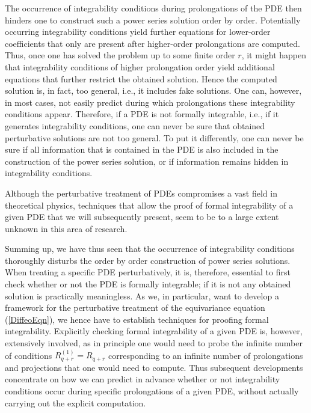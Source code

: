 The occurrence of integrability conditions during prolongations of the PDE then hinders one to construct such a power series solution order by order. Potentially occurring integrability conditions yield further equations for lower-order coefficients that only are present after higher-order prolongations are computed. Thus, once one has solved the problem up to some finite order $r$, it might happen that integrability conditions of higher prolongation order yield additional equations that further restrict the obtained solution. 
Hence the computed solution is, in fact, too general, i.e., it includes fake solutions.
One can, however, in most cases, not easily predict during which prolongations these integrability conditions appear. Therefore, if a PDE is not formally integrable, i.e., if it generates integrability conditions, one can never be sure that obtained perturbative solutions are not too general. To put it differently, one can never be sure if all information that is contained in the PDE is also included in the construction of the power series solution, or if information remains hidden in integrability conditions.

Although the perturbative treatment of PDEs compromises a vast field in theoretical physics, techniques that allow the proof of formal integrability of a given PDE that we will subsequently present, seem to be to a large extent unknown in this area of research. 

Summing up, we have thus seen that the occurrence of integrability conditions thoroughly disturbs the order by order construction of power series solutions. When treating a specific PDE perturbatively, it is, therefore, essential to first check whether or not the PDE is formally integrable; if it is not any obtained solution is practically meaningless.
As we, in particular, want to develop a framework for the perturbative treatment of the equivariance equation (\ref{DiffeoEqn}), we hence have to establish techniques for proofing formal integrability.
Explicitly checking formal integrability of a given PDE is, however, extensively involved, as in principle one would need to probe the infinite number of conditions $R_{q+r}^{(1)} = R_{q+r}$ corresponding to an infinite number of prolongations and projections that one would need to compute. Thus subsequent developments concentrate on how we can predict in advance whether or not integrability conditions occur during specific prolongations of a given PDE, without actually carrying out the explicit computation.

